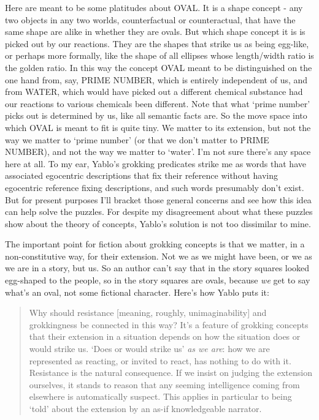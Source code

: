 Here are meant to be some platitudes about OVAL. It is a shape concept - any two objects in any two worlds, counterfactual or counteractual, that have the same shape are alike in whether they are ovals. But which shape concept it is is picked out by our reactions. They are the shapes that strike us as being egg-like, or perhaps more formally, like the shape of all ellipses whose length/width ratio is the golden ratio. In this way the concept OVAL meant to be distinguished on the one hand from, say, PRIME NUMBER, which is entirely independent of us, and from WATER, which would have picked out a different chemical substance had our reactions to various chemicals been different. Note that what `prime number' picks out is determined by us, like all semantic facts are. So the move space into which OVAL is meant to fit is quite tiny. We matter to its extension, but not the way we matter to `prime number' (or that we don't matter to PRIME NUMBER), and not the way we matter to `water'. I'm not sure there's any space here at all. To my ear, Yablo's grokking predicates strike me as words that have associated egocentric descriptions that fix their reference without having egocentric reference fixing descriptions, and such words presumably don't exist. But for present purposes I'll bracket those general concerns and see how this idea can help solve the puzzles. For despite my disagreement about what these puzzles show about the theory of concepts, Yablo's solution is not too dissimilar to mine.

The important point for fiction about grokking concepts is that we matter, in a non-constitutive way, for their extension. Not we as we might have been, or we as we are in a story, but us. So an author can't say that in the story squares looked egg-shaped to the people, so in the story squares are ovals, because \textit{we }get to say what's an oval, not some fictional character. Here's how Yablo puts it:

\begin{quote}
Why should resistance [meaning, roughly, unimaginability] and grokkingness be connected in this way? It's a feature of grokking concepts that their extension in a situation depends on how the situation does or would strike us. `Does or would strike us' \textit{as we are}: how we are represented as reacting, or invited to react, has nothing to do with it. Resistance is the natural consequence. If we insist on judging the extension ourselves, it stands to reason that any seeming intelligence coming from elsewhere is automatically suspect. This applies in particular to being `told' about the extension by an as-if knowledgeable narrator. \citeyearpar[485]{Yablo2002}
\end{quote}

